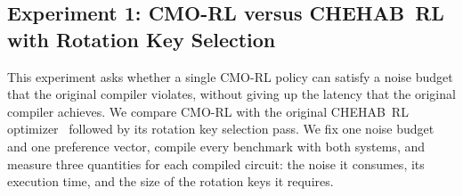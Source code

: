 %

\providecommand{\cmorl}{\textsc{CMO-RL}}
\providecommand{\chehabrl}{\textsc{CHEHAB~RL}}
\providecommand{\rks}{\textsc{RKS}}                 %
\providecommand{\baseline}{\chehabrl{}+\rks{}}
\providecommand{\wexec}{w_{\mathit{exec}}}
\providecommand{\wkeys}{w_{\mathit{keys}}}
\providecommand{\budget}{\mathcal{B}}
\providecommand{\ex}[1]{\textcolor{red}{#1}}        %
\providecommand{\todo}[1]{\textcolor{blue}{[TODO: #1]}}

\subsection{Experiment 1: \cmorl{} versus \chehabrl{} with Rotation Key Selection}
\label{sec:exp1}

This experiment asks whether a single \cmorl{} policy can satisfy a noise
budget that the original compiler violates, without giving up the latency
that the original compiler achieves. We compare \cmorl{} with the original
\chehabrl{} optimizer~\cite{chehabrl} followed by its rotation key selection
pass. We fix one noise budget and one preference vector, compile every
benchmark with both systems, and measure three quantities for each compiled
circuit: the noise it consumes, its execution time, and the size of the
rotation keys it requires.

